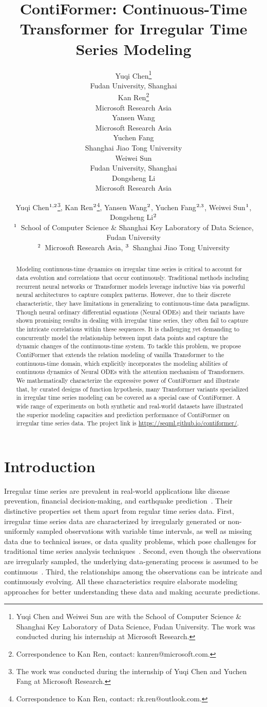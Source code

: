 \documentclass{article}
\title{ContiFormer: Continuous-Time Transformer for Irregular Time Series Modeling}
\author{%
  Yuqi Chen\thanks{Yuqi Chen and Weiwei Sun are with the School of Computer Science \& Shanghai Key Laboratory of Data Science, Fudan University. The work was conducted during his internship at Microsoft Research.}  \\
  Fudan University, Shanghai \\
  \And
  Kan Ren\thanks{Correspondence to Kan Ren, contact: kanren@microsoft.com.} \\
  Microsoft Research Asia \\
  \And
  Yansen Wang \\
  Microsoft Research Asia \\
  \And
  Yuchen Fang \\
  Shanghai Jiao Tong University \\
  \And
  Weiwei Sun \\
  Fudan University, Shanghai \\
  \And
  Dongsheng Li \\
  Microsoft Research Asia \\
}
\author{
    Yuqi Chen$\textsuperscript{1,2}$\thanks{The work was conducted during the internship of Yuqi Chen and Yuchen Fang at Microsoft Research.}, 
    Kan Ren$\textsuperscript{2}$\thanks{Correspondence to Kan Ren, contact: rk.ren@outlook.com.}, 
    Yansen Wang$\textsuperscript{2}$, 
    Yuchen Fang$\textsuperscript{2,3}$, 
    Weiwei Sun$\textsuperscript{1}$, 
    Dongsheng Li$\textsuperscript{2}$ \\
    $\textsuperscript{1}$\ School of Computer Science \& Shanghai Key Laboratory of Data Science, Fudan University  \\
    $\textsuperscript{2}$\ Microsoft Research Asia, $\textsuperscript{3}$\ Shanghai Jiao Tong University \\
}
\begin{document}
\maketitle

\begin{abstract}
Modeling continuous-time dynamics on irregular time series is critical to account for data evolution and correlations that occur continuously. Traditional methods including recurrent neural networks or Transformer models leverage inductive bias via powerful neural architectures to capture complex patterns. However, due to their discrete characteristic, they have limitations in generalizing to continuous-time data paradigms. Though neural ordinary differential equations (Neural ODEs) and their variants have shown promising results in dealing with irregular time series, they often fail to capture the intricate correlations within these sequences. It is challenging yet demanding to concurrently model the relationship between input data points and capture the dynamic changes of the continuous-time system. To tackle this problem, we propose ContiFormer that extends the relation modeling of vanilla Transformer to the continuous-time domain, which explicitly incorporates the modeling abilities of continuous dynamics of Neural ODEs with the attention mechanism of Transformers. We mathematically characterize the expressive power of ContiFormer and illustrate that, by curated designs of function hypothesis, many Transformer variants specialized in irregular time series modeling can be covered as a special case of ContiFormer. A wide range of experiments on both synthetic and real-world datasets have illustrated the superior modeling capacities and prediction performance of ContiFormer on irregular time series data. The project link is \href{https://seqml.github.io/contiformer/}{https://seqml.github.io/contiformer/}.
  
\end{abstract}


\section{Introduction}

Irregular time series are prevalent in real-world applications like disease prevention, financial decision-making, and earthquake prediction~\cite{zuo2020transformer, bauer2016arrow, jia2019neural}. Their distinctive properties set them apart from regular time series data.
First, irregular time series data are characterized by irregularly generated or non-uniformly sampled observations with variable time intervals, as well as missing data due to technical issues, or data quality problems, which pose challenges for traditional time series analysis techniques~\cite{che2018recurrent, yue2022ts2vec}.
Second, even though the observations are irregularly sampled, the underlying data-generating process is assumed to be continuous~\cite{rubanova2019latent, kidger2020neural, park2022neural}.
Third, the relationships among the observations can be intricate and continuously evolving.
All these characteristics require elaborate modeling approaches for better understanding these data and making accurate predictions.
\end{document}
